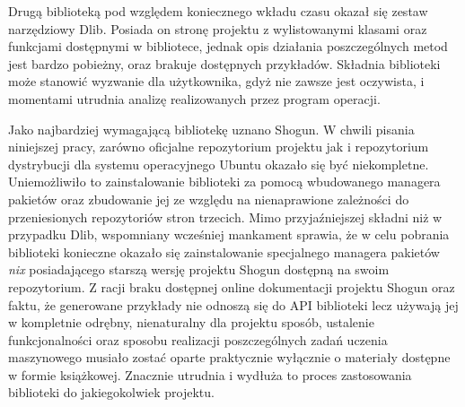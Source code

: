 Drugą biblioteką pod względem koniecznego wkładu czasu okazał się zestaw narzędziowy Dlib. Posiada on stronę projektu z wylistowanymi klasami oraz funkcjami dostępnymi w bibliotece, jednak opis działania poszczególnych metod jest bardzo pobieżny, oraz brakuje dostępnych przykładów. Składnia biblioteki może stanowić wyzwanie dla użytkownika, gdyż nie zawsze jest oczywista, i momentami utrudnia analizę realizowanych przez program operacji.

Jako najbardziej wymagającą bibliotekę uznano Shogun. W chwili pisania niniejszej pracy, zarówno oficjalne repozytorium projektu jak i repozytorium dystrybucji dla systemu operacyjnego Ubuntu okazało się być niekompletne. Uniemożliwiło to zainstalowanie biblioteki za pomocą wbudowanego managera pakietów oraz zbudowanie jej ze względu na nienaprawione zależności do przeniesionych repozytoriów stron trzecich. Mimo przyjaźniejszej składni niż w przypadku Dlib, wspomniany wcześniej mankament sprawia, że w celu pobrania biblioteki konieczne okazało się zainstalowanie specjalnego managera pakietów \textit{nix} posiadającego starszą wersję projektu Shogun dostępną na swoim repozytorium. Z racji braku dostępnej online dokumentacji projektu Shogun oraz faktu, że generowane przykłady nie odnoszą się do API biblioteki lecz używają jej w kompletnie odrębny, nienaturalny dla projektu sposób, ustalenie funkcjonalności oraz sposobu realizacji poszczególnych zadań uczenia maszynowego musiało zostać oparte praktycznie wyłącznie o materiały dostępne w formie książkowej. Znacznie utrudnia i wydłuża to proces zastosowania biblioteki do jakiegokolwiek projektu.